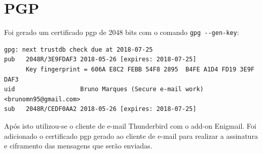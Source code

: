 \documentclass[
    article,            %
    11pt,               %
    oneside,            %
    a4paper,            %
    english,            %
    brazil,             %
    sumario=tradicional,
    ]{abntex2}
\begin{document}

\frenchspacing 


%
%

\maketitle


\textual


\section{\textbf{PGP}}

Foi gerado um certificado pgp de 2048 bits com o comando \texttt{gpg -{}-gen-key}:

\begin{Verbatim}[frame=single, commandchars=\\\{\}, fontsize=\footnotesize]
gpg: next trustdb check due at 2018-07-25
pub   2048R/3E9FDAF3 2018-05-26 [expires: 2018-07-25]
      Key fingerprint = 606A E8C2 FEBB 54F8 2895  B4FE A1D4 FD19 3E9F DAF3
uid                  Bruno Marques (Secure e-mail work) <brunomn95@gmail.com>
sub   2048R/CEDF0AA2 2018-05-26 [expires: 2018-07-25]
\end{Verbatim}

\indent Após isto utilizou-se o cliente de e-mail Thunderbird com o add-on Enigmail. Foi adicionado o certificado pgp gerado ao cliente de e-mail para realizar a assinatura e ciframento das mensagens que serão enviadas.
\end{document}
